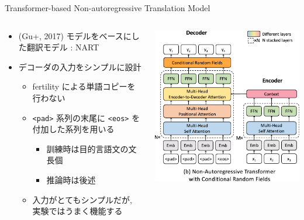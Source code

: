 \documentclass[unicode, 12pt, aspectratio=43]{beamer}
\begin{document}
\begin{frame}[containsverbatim,label={sec:orga17dc53}]{\normalsize Transformer-based Non-autoregressive Translation Model}
\begin{columns}
\begin{column}{0.6\columnwidth}
\begin{itemize}
\item (Gu+, 2017) モデルをベースにした翻訳モデル : NART
\item デコーダの入力をシンプルに設計
\begin{itemize}
\item fertility による単語コピーを行わない
\item \verb|<pad>| 系列の末尾に \verb|<eos>| を付加した系列を用いる
\begin{itemize}
\item 訓練時は目的言語文の文長個
\item 推論時は後述
\end{itemize}
\item 入力がとてもシンプルだが, 実験ではうまく機能する
\end{itemize}
\end{itemize}
\end{column}

\begin{column}{0.4\columnwidth}
\begin{center}
\includegraphics[width=1.0\linewidth]{./figure/Figure1_b.pdf}
\end{center}
\end{column}
\end{columns}
\end{frame}
\end{document}
